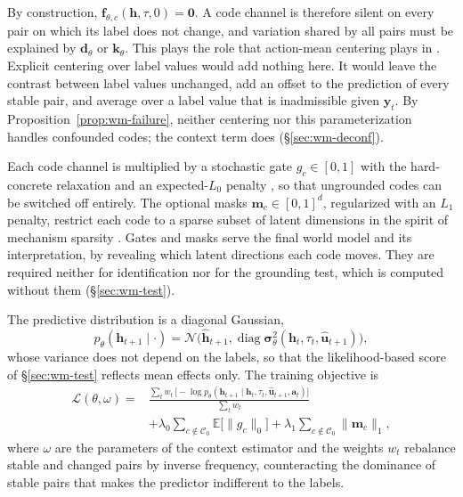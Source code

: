 By construction, $\mathbf{f}_{\theta,c}(\mathbf{h},\tau,0)=\mathbf{0}$. A code channel is therefore silent on every pair on which its label does not change, and variation shared by all pairs must be explained by $\mathbf{d}_\theta$ or $\mathbf{k}_\theta$. This plays the role that action-mean centering plays in \citet{li2026dueling}. Explicit centering over label values would add nothing here. It would leave the contrast between label values unchanged, add an offset to the prediction of every stable pair, and average over a label value that is inadmissible given $\mathbf{y}_t$. By Proposition~\ref{prop:wm-failure}, neither centering nor this parameterization handles confounded codes; the context term does (\S\ref{sec:wm-deconf}).

Each code channel is multiplied by a stochastic gate $g_c\in[0,1]$ with the hard-concrete relaxation and an expected-$L_0$ penalty \citep{louizos2018l0}, so that ungrounded codes can be switched off entirely. The optional masks $\mathbf{m}_c\in[0,1]^{d}$, regularized with an $L_1$ penalty, restrict each code to a sparse subset of latent dimensions in the spirit of mechanism sparsity \citep{lachapelle2026sparsity}. Gates and masks serve the final world model and its interpretation, by revealing which latent directions each code moves. They are required neither for identification nor for the grounding test, which is computed without them (\S\ref{sec:wm-test}).

The predictive distribution is a diagonal Gaussian,
\begin{equation}
p_\theta(\mathbf{h}_{t+1}\mid\cdot)=\mathcal{N}\big(\hat{\mathbf{h}}_{t+1},\operatorname{diag}\boldsymbol{\sigma}^2_\theta(\mathbf{h}_t,\tau_t,\hat{\mathbf{u}}_{t+1})\big),
\end{equation}
whose variance does not depend on the labels, so that the likelihood-based score of \S\ref{sec:wm-test} reflects mean effects only. The training objective is
\begin{equation}
\label{eq:wm-objective}
\begin{split}
\mathcal{L}(\theta,\omega)={}&\frac{\sum_t w_t\,\big[-\log p_\theta(\mathbf{h}_{t+1}\mid\mathbf{h}_t,\tau_t,\hat{\mathbf{u}}_{t+1},\mathbf{a}_t)\big]}{\sum_t w_t}\\
&+\lambda_0\sum_{c\notin\mathcal{C}_0}\mathbb{E}\big[\|g_c\|_0\big]+\lambda_1\sum_{c\notin\mathcal{C}_0}\|\mathbf{m}_c\|_1,
\end{split}
\end{equation}
where $\omega$ are the parameters of the context estimator and the weights $w_t$ rebalance stable and changed pairs by inverse frequency, counteracting the dominance of stable pairs that makes the predictor indifferent to the labels.

